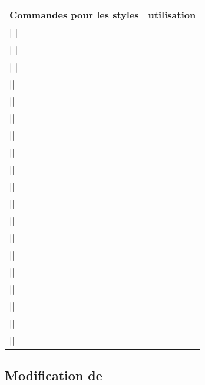 \medskip 
\begin{tabular}{lc}\toprule
Commandes pour les styles   & utilisation      \\  \midrule
|\newcommand*{\VertexInnerSep}{0pt} |         &\\
|\newcommand*{\VertexOuterSep}{0pt} |         &\\
|\newcommand*{\VertexDistance}{3cm} |         &\\
|\newcommand*{\VertexShape}{circle}|          &\\
|\newcommand*{\VertexLineWidth}{0.8pt}|         &\\
|\newcommand*{\VertexLineColor}{black}|       &\\
|\newcommand*{\VertexLightFillColor}{white}|  &\\
|\newcommand*{\VertexDarkFillColor}{black}|   &\\
|\newcommand*{\VertexTextColor}{black}|       &\\
|\newcommand*{\VertexFillColor}{black}|       &\\
|\newcommand*{\VertexBallColor}{orange}|      &\\
|\newcommand*{\VertexBigMinSize}{24pt}|       &\\
|\newcommand*{\VertexInterMinSize}{18pt}|     &\\
|\newcommand*{\VertexSmallMinSize}{12pt}|     &\\
|\newcommand*{\EdgeFillColor}{orange}|        &\\
|\newcommand*{\EdgeArtColor}{orange}|         &\\
|\newcommand*{\EdgeColor}{black}|             &\\
|\newcommand*{\EdgeDoubleDistance}{1pt}|      &\\
|\newcommand*{\EdgeLineWidth}{0.8pt}|         &\\ \bottomrule
\end{tabular}



\subsection{Modification de }
\begin{center}
\begin{tkzexample}[vbox]
\end{tkzexample}
\end{center} 


